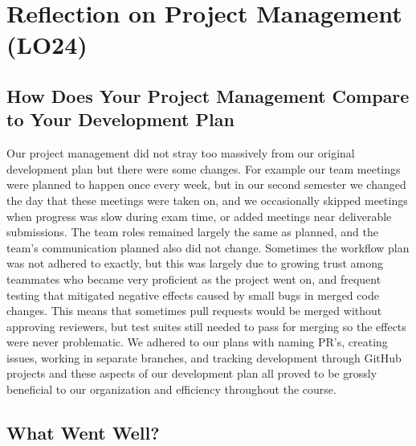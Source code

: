 \documentclass{article}
\begin{document}
\section{Reflection on Project Management (LO24)}


\subsection{How Does Your Project Management Compare to Your Development Plan}


Our project management did not stray too massively from our original development plan but there were some changes. For example our team meetings were planned to happen once every week, but in our second semester we changed the day that these meetings were taken on, and we occasionally skipped meetings when progress was slow during exam time, or added meetings near deliverable submissions. The team roles remained largely the same as planned, and the team's communication planned also did not change. Sometimes the workflow plan was not adhered to exactly, but this was largely due to growing trust among teammates who became very proficient as the project went on, and frequent testing that mitigated negative effects caused by small bugs in merged code changes. This means that sometimes pull requests would be merged without approving reviewers, but test suites still needed to pass for merging so the effects were never problematic. We adhered to our plans with naming PR's, creating issues, working in separate branches, and tracking development through GitHub projects and these aspects of our development plan all proved to be grossly beneficial to our organization and efficiency throughout the course.


\subsection{What Went Well?}

\end{document}
